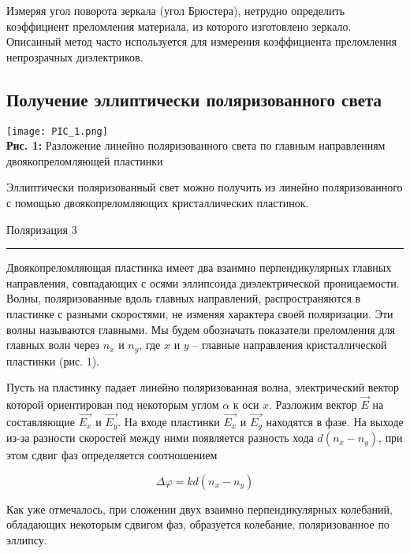 \documentclass[12pt,a4paper]{scrartcl}
\begin{document}
	Измеряя угол поворота зеркала (угол Брюстера), нетрудно определить коэффициент преломления материала, из которого изготовлено
	зеркало. Описанный метод часто используется для измерения коэффициента преломления непрозрачных диэлектриков.
	
	\subsection{Получение эллиптически поляризованного света}
	
	\begin{center}
		\texttt{[image: PIC\_1.png]}
		\\\textbf{Рис. 1:} Разложение линейно поляризованного света по главным направлениям двоякопреломляющей пластинки
	\end{center}
	
	Эллиптически поляризованный свет можно получить из линейно поляризованного с
	помощью двоякопреломляющих кристаллических пластинок.
	
	\newpage
	
	
	\begin{flushleft}
		\footnotesize{Поляризация} \hspace{\fill} \footnotesize{3}
		\\[-0.3cm]\noindent\rule{\textwidth}{0.3pt}
	\end{flushleft}
	
	Двоякопреломляющая пластинка имеет два взаимно перпендикулярных главных направления, совпадающих с осями эллипсоида диэлектрической проницаемости. Волны, поляризованные вдоль главных направлений, распространяются в пластинке с разными скоростями, не изменяя характера своей поляризации. Эти волны называются главными. Мы будем обозначать показатели преломления для главных волн через $ n_x $ и $ n_y $, где $ x $ и $ y $ -- главные направления кристаллической пластинки (рис. 1).
	
	Пусть на пластинку падает линейно поляризованная волна, электрический вектор которой ориентирован под некоторым углом $\alpha$ к оси $x$. Разложим вектор $\vec{E}$ на составляющие $\vec{E_x}$ и $\vec{E_y}$. На входе пластинки $\vec{E_x}$ и $\vec{E_y}$ находятся в фазе. На выходе из-за разности скоростей между ними появляется разность хода $ d(n_x - n_y) $, при этом сдвиг фаз определяется соотношением
	
	$$\Delta \varphi = k d(n_x - n_y)$$	
	
	Как уже отмечалось, при сложении двух взаимно перпендикулярных колебаний, обладающих некоторым сдвигом фаз, образуется колебание, поляризованное по эллипсу.
	
\end{document}
